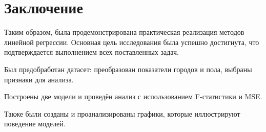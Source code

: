 \chapter{Заключение}
Таким образом, была продемонстрирована практическая реализация методов линейной регрессии. Основная цель исследования была успешно достигнута, что подтверждается выполнением всех поставленных задач.

Был предобработан датасет: преобразован показатели городов и пола, выбраны признаки для анализа.

Построены две модели и проведён анализ с использованием F-статистики и MSE.

Также были созданы и проанализированы графики, которые иллюстрируют поведение моделей.
